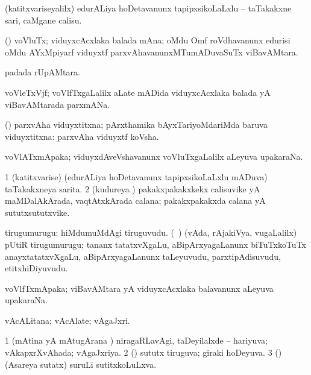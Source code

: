 \bentry 
{} 
\gl{\akirx}
\expl{}
\bmng
 (katitxvariseyalilx) edurALiya hoDetavanunx tapipxsikoLaLxlu -- taTakakxne sari, caMgane calisu. 
\emng
\eentry

\bentry
{} 
\gl{\nA}
\expl{}
\bmng
 (\viduyx) voVluTx; viduyxcAcxlaka balada mAna; oMdu Omf roVdhavanunx edurisi oMdu AYxMpiyarf viduyxtf parxvAhavanunxMTumADuvaSuTx viBavAMtara. 
\emng
\eentry

\bentry 
{} 
\gl{\nA}
\expl{}
\bmng
  padada rUpAMtara. 
\emng
\eentry

\bentry
{} 
\gl{\nA}
\expl{}
\bmng
 voVleTxVjf; voVlfTxgaLalilx aLate mADida viduyxcAcxlaka balada yA viBavAMtarada parxmANa. 
\emng
\eentry

\bentry 
{} 
\gl{\gu}
\expl{}
\bmng
 (\pArxparx) parxvAha viduyxtitxna; pArxthamika bAyxTariyoMdariMda baruva viduyxtitxna:  parxvAha viduyxtf koVsha. 
\emng
\eentry

\bentry 
{} 
\gl{\nA}
\expl{}
\bmng
 voVlATxmApaka; viduyxdAveVshavanunx voVluTxgaLalilx aLeyuva upakaraNa. 
\emng
\eentry

\bentry 
{} 
\gl{\nA}
\expl{}
\bmng
\bnum
\num{1} (katitxvarise) (edurALiya hoDetavanunx tapipxsikoLaLxlu mADuva) taTakakxneya sarita. 
\num{2} (kudureya \vi) pakakxpakakxkekx calisuvike yA maMDalAkArada, vaqtAtxkArada calana; pakakxpakakxda calana yA sututxsututxvike. 
\enum
\emng
\eentry

\bentry 
{} 
\gl{\nA}
\expl{}
\bmng
tirugumurugu: 
\banum
{} hiMdumuMdAgi tiruguvudu. 
 (\kanmu\ \rUpa) (vAda, rAjakiVya, \mo vugaLalilx) pUtiR tirugumurugu; tananx tatatxvXgaLu, aBipArxyagaLanunx biTuTxkoTuTx anayxtatatxvXgaLu, aBipArxyagaLanunx taLeyuvudu, parxtipAdisuvudu, etitxhiDiyuvudu. 
\eanum
\emng
\eentry

\bentry 
{} 
\gl{\nA}
\expl{}
\bmng
 voVlfTxmApaka; viBavAMtara yA viduyxcAcxlaka balavanunx aLeyuva upakaraNa. 
\emng
\eentry

\bentry
{} 
\gl{\nA}
\expl{}
\bmng
 vAcALitana; vAcAlate; vAgaJxri. 
\emng
\eentry

\bentry
{} 
\gl{\gu}
\expl{}
\bmng
\bnum
\num{1} (mAtina yA mAtugArana \vi) niragaRLavAgi, taDeyilalxde -- hariyuva; vAkapxrXvAhada; vAgaJxriya. 
\num{2} (\pArxparx) sututx tiruguva; giraki hoDeyuva. 
\num{3} (\savi) (Asareya sutatx) suruLi sutitxkoLuLxva. 
\enum
\emng
\eentry

